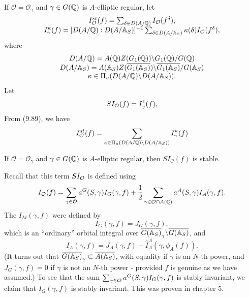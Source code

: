 If $\mathcal{O}=\mathcal{O}_\gamma $ and
$\gamma \in G({\Bbb{Q}})$ is $A$-elliptic regular, let 
\begin{equation}
\begin{array}{c}
I^{st}_{\cal{O}}(f)=
\sum_{\delta\in D(A/{\Bbb{Q}})}
I_{\cal{O}} (f^\delta),\\
I^\kappa_\gamma(f)
=[D(A/{\Bbb{Q}}):D(A/{\Bbb{A}}_S)]^{-1}
\sum_{\delta\in D(A/{\Bbb{A}}_S)}
\kappa(\delta) I_{\cal{O}} (f^\delta),
\end{array}
\end{equation}
where
\[
\begin{array}{c}
D(A/{\Bbb{Q}})
=A({\Bbb{Q}})Z(G_1({\Bbb{Q}}))\backslash G_1({\Bbb{Q}})/G({\Bbb{Q}}) \\
D(A/{\Bbb{A}}_S)
=A({\Bbb{A}}_S)Z(\overline{G_1({\Bbb{A}}_S)})
\backslash \overline{G_1({\Bbb{A}}_S)}/G({\Bbb{A}}_S) \\
\kappa\in \Pi_u(D(A/{\Bbb{Q}})\backslash D(A/{\Bbb{A}}_S)).
\end{array}
\]
Let
\[
SI_{\cal{O}}(f)=I^1_{\gamma} (f),
\]
From (9.89), we have
\begin{equation}
I^{st}_{\cal{O}}(f)=
\sum_{\kappa\in \Pi_u(D(A/{\Bbb{Q}})\backslash D(A/{\Bbb{A}}_S))}
I^\kappa_\gamma(f)
\end{equation}
\begin{lemma}
If $\mathcal{O}=\mathcal{O}_\gamma $ and
$\gamma \in G({\Bbb{Q}})$ is $A$-elliptic regular, then
$SI_{\mathcal{O}}(f)$ is stable.
\end{lemma}

Recall that this term $SI_{\cal{O}}$ is defined using
\begin{equation}
I_{\cal{O}}(f)
=\sum_{\gamma\in {\cal{O}}}a^G(S,\gamma)I_G(\gamma,f)
+{1\over 2}\sum_{\gamma\in {\cal{O}}\cap A({\Bbb{Q}})}
a^A(S,\gamma)I_A(\gamma,f).
\end{equation}
The $I_M(\gamma,f)$ were defined by
\[
I_G(\gamma,f)=J_G(\gamma,f),
\]
which is an ``ordinary'' orbital integral over
$\overline{G({\Bbb{A}}_S)}_\gamma\backslash \overline{G({\Bbb{A}}_S)}$, and
\[
I_A(\gamma,f)=J_A(\gamma,f)-\hat{I}_A^A(\gamma,\phi_A(f)).
\]
(It turns out that
$\overline{G({\Bbb{A}}_S)}_\gamma\subset \overline{A({\Bbb{A}}_S)}$,
with equality if $\gamma$ is an $N$-th power, and
$J_G(\gamma,f)=0$ if $\gamma$ is not an $N$-th power - provided
$f$ is genuine as we have assumed.)
To see that the sum
$\sum_{\gamma\in {\cal{O}}}a^G(S,\gamma)I_G(\gamma,f)$
is stably invariant, we claim that $I_G(\gamma,f)$ is stably invariant.
This was proven in chapter 5.


